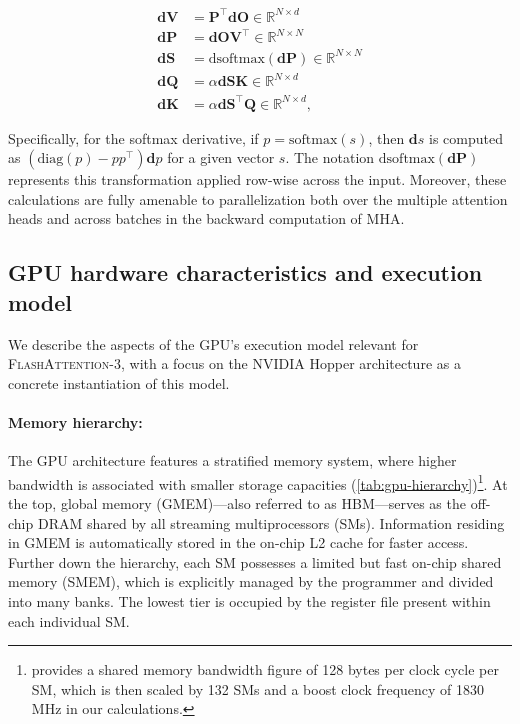\begin{align*}
  \mathbf{dV} &= \mathbf{P}^\top \mathbf{dO} \in \mathbb{R}^{N \times d} \\
  \mathbf{dP} &= \mathbf{dO} \mathbf{V}^\top \in \mathbb{R}^{N \times N} \\
  \mathbf{dS} &= \mathrm{dsoftmax} (\mathbf{dP}) \in \mathbb{R}^{N \times N} \\
  \mathbf{dQ} &= \alpha \mathbf{dS} \mathbf{K} \in \mathbb{R}^{N \times d} \\
  \mathbf{dK} &= \alpha \mathbf{dS}^\top \mathbf{Q} \in \mathbb{R}^{N \times d},
\end{align*}

Specifically, for the softmax derivative, if $p = \mathrm{softmax}(s)$, then $\mathbf{d}s$ is computed as $(\mathrm{diag}(p) - p p^\top)\mathbf{d}p$ for a given vector $s$. The notation $\mathrm{dsoftmax}(\mathbf{dP})$ represents this transformation applied row-wise across the input. Moreover, these calculations are fully amenable to parallelization both over the multiple attention heads and across batches in the backward computation of MHA.

\subsection{GPU hardware characteristics and execution model}
\label{subsec:hardware}

We describe the aspects of the GPU's execution model relevant for \textsc{FlashAttention-3}, with a focus on the NVIDIA Hopper architecture as a concrete instantiation of this model.

\paragraph{Memory hierarchy:} The GPU architecture features a stratified memory system, where higher bandwidth is associated with smaller storage capacities (\cref{tab:gpu-hierarchy})\footnote{\citet{luo2024benchmarking} provides a shared memory bandwidth figure of 128 bytes per clock cycle per SM, which is then scaled by 132 SMs and a boost clock frequency of 1830 MHz in our calculations.}. At the top, global memory (GMEM)—also referred to as HBM—serves as the off-chip DRAM shared by all streaming multiprocessors (SMs). Information residing in GMEM is automatically stored in the on-chip L2 cache for faster access. Further down the hierarchy, each SM possesses a limited but fast on-chip shared memory (SMEM), which is explicitly managed by the programmer and divided into many banks. The lowest tier is occupied by the register file present within each individual SM.

